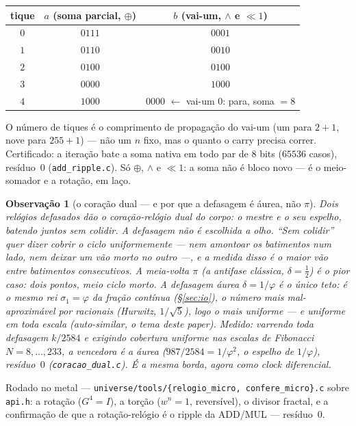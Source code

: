 \documentclass[11pt,a4paper]{article}
\newtheorem{observacao}{Observação}
\begin{document}
\begin{center}
\begin{tabular}{ccc}
\toprule
tique & $a$ (soma parcial, $\oplus$) & $b$ (vai-um, $\land$ e $\ll 1$) \\
\midrule
$0$ & $0111$ & $0001$ \\
$1$ & $0110$ & $0010$ \\
$2$ & $0100$ & $0100$ \\
$3$ & $0000$ & $1000$ \\
$4$ & $1000$ & $0000$ \quad $\leftarrow$ vai-um $0$: para, soma $=8$ \\
\bottomrule
\end{tabular}
\end{center}

O número de tiques é o comprimento de propagação do vai-um (um para $2+1$, nove para $255+1$)
--- não um $n$ fixo, mas o quanto o carry precisa correr. Certificado: a iteração bate a soma nativa
em todo par de $8$ bits ($65536$ casos), resíduo~$0$ (\texttt{add\_ripple.c}). Só $\oplus$, $\land$ e $\ll 1$:
a soma não é bloco novo --- é o meio-somador e a rotação, em laço.

\begin{observacao}[o coração dual --- e por que a defasagem é áurea, não $\pi$]
Dois relógios defasados dão o coração-relógio dual do corpo: o mestre e o seu espelho, batendo juntos
sem colidir. A defasagem não é escolhida a olho. ``Sem colidir'' quer dizer cobrir o ciclo uniformemente ---
nem amontoar os batimentos num lado, nem deixar um vão morto no outro ---, e a medida
disso é o maior vão entre batimentos consecutivos. A meia-volta $\pi$ (a antifase clássica, $\delta=\tfrac12$)
é o pior caso: dois pontos, meio ciclo morto. A defasagem áurea $\delta=1/\varphi$ é o único teto:
é o mesmo rei $\sigma_{1}=\varphi$ da fração contínua (\S\ref{sec:io}), o número mais mal-aproximável por racionais
(Hurwitz, $1/\sqrt{5}$), logo o mais uniforme --- e uniforme em toda escala (auto-similar, o tema deste
paper). Medido: varrendo toda defasagem $k/2584$ e exigindo cobertura uniforme nas escalas de
Fibonacci $N=8,\ldots,233$, a vencedora é a áurea ($987/2584=1/\varphi^{2}$, o espelho de $1/\varphi$), resíduo~$0$
(\texttt{coracao\_dual.c}). É a mesma borda, agora como clock diferencial.
\end{observacao}

Rodado no metal --- \texttt{universe/tools/\{relogio\_micro, confere\_micro\}.c} sobre \texttt{api.h}: a rotação
($G^{4}=I$), a torção ($w^{n}=1$, reversível), o divisor fractal, e a confirmação de que a rotação-relógio
é o ripple da ADD/MUL --- resíduo~$0$.
\end{document}
